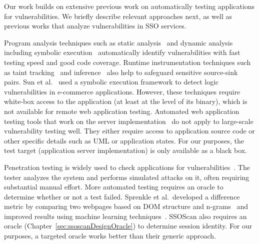 Our work builds on extensive previous work on automatically testing applications for vulnerabilities.  We briefly describe relevant approaches next, as well as previous works that analyze vulnerabilities in SSO services.

 Program analysis techniques such as static analysis~\cite{Ball:2002:SLP:503272.503274} and dynamic analysis including symbolic execution~\cite{Cadar:2005:EGT:2156342.2156345,Kudzu} automatically identify vulnerabilities with fast testing speed and good code coverage.  Runtime instrumentation techniques such as taint tracking~\cite{Nentwich07cross-sitescripting} and inference~\cite{DBLP:conf:ndss:Sekar09} also help to safeguard sensitive source-sink pairs.  Sun et al.~\cite{SunDetectLogic} used a symbolic execution framework to detect logic vulnerabilities in e-commerce applications.  However, these techniques require white-box access to the application (at least at the level of its binary), which is not available for remote web application testing.  Automated web application testing tools that work on the server implementation~\cite{1167787,Ricca:2001:ATW:381473.381476,Alshahwan:2011:AWA:2190078.2190141} do not apply to large-scale vulnerability testing well.  They either require access to application source code or other specific details such as UML or application states.  For our purposes, the test target (application server implementation) is only available as a black box.

 Penetration testing is widely used to check applications for vulnerabilities~\cite{whitehat,redspin}.  The tester analyzes the system and performs simulated attacks on it, often requiring substantial manual effort.  More automated testing requires an oracle to determine whether or not a test failed.  Sprenkle et al.\ developed a difference metric by comparing two webpages based on DOM structure and n-grams~\cite{Sprenkle:2005:ARF:1101908.1101947} and improved results using machine learning techniques~\cite{Sprenkle07learningeffective}.  SSOScan also requires an oracle (Chapter~\ref{sec:ssoscanDesignOracle}) to determine session identity. For our purposes, a targeted oracle works better than their generic approach.

